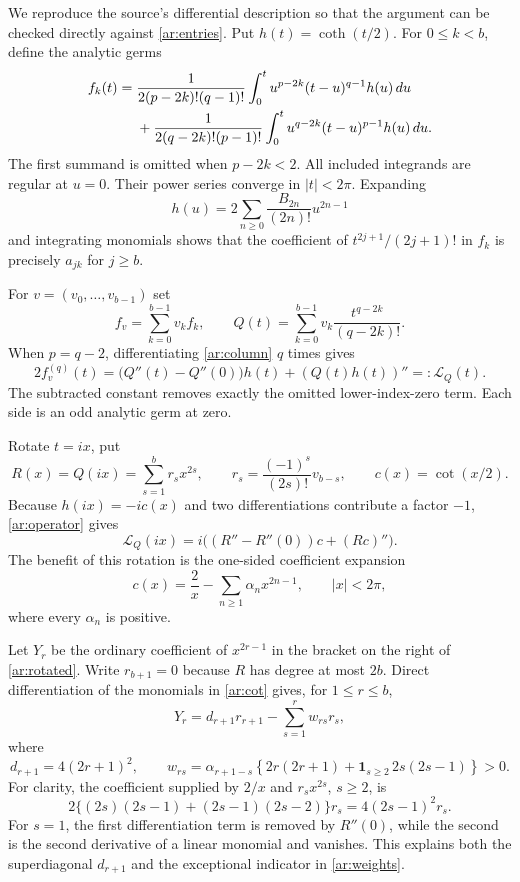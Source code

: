 \documentclass[11pt,a4paper]{article}
\numberwithin{equation}{section}
\theoremstyle{definition}
\theoremstyle{remark}
\begin{document}
We reproduce the source's differential description so that the argument
can be checked directly against \eqref{ar:entries}. Put $h(t)=\coth(t/2)$.
For $0\le k<b$, define the analytic germs
\begin{align}
 f_k(t)={}&\frac{1}{2(p-2k)!(q-1)!}
      \int_0^t u^{p-2k}(t-u)^{q-1}h(u)\,du\notag\\
 &+\frac{1}{2(q-2k)!(p-1)!}
      \int_0^t u^{q-2k}(t-u)^{p-1}h(u)\,du.
 \label{ar:column}
\end{align}
The first summand is omitted when $p-2k<2$. All included integrands
are regular at $u=0$. Their power series converge in $|t|<2\pi$.
Expanding
\[
        h(u)=2\sum_{n\ge0}\frac{B_{2n}}{(2n)!}u^{2n-1}
\]
and integrating monomials shows that the coefficient of
$t^{2j+1}/(2j+1)!$ in $f_k$ is precisely $a_{jk}$ for $j\ge b$.

For $v=(v_0,\ldots,v_{b-1})$ set
\[
 f_v=\sum_{k=0}^{b-1}v_kf_k,
 \qquad Q(t)=\sum_{k=0}^{b-1}v_k\frac{t^{q-2k}}{(q-2k)!}.
\]
When $p=q-2$, differentiating \eqref{ar:column} $q$ times gives
\begin{equation}\label{ar:operator}
 2f_v^{(q)}(t)
    =\bigl(Q''(t)-Q''(0)\bigr)h(t)+(Q(t)h(t))''
    =:\mathcal L_Q(t).
\end{equation}
The subtracted constant removes exactly the omitted lower-index-zero
term. Each side is an odd analytic germ at zero.

Rotate $t=ix$, put
\[
 R(x)=Q(ix)=\sum_{s=1}^b r_sx^{2s},\qquad
 r_s=\frac{(-1)^s}{(2s)!}v_{b-s},
 \qquad c(x)=\cot(x/2).
\]
Because $h(ix)=-ic(x)$ and two differentiations contribute a factor
$-1$, \eqref{ar:operator} gives
\begin{equation}\label{ar:rotated}
 \mathcal L_Q(ix)=i\bigl((R''-R''(0))c+(Rc)''\bigr).
\end{equation}
The benefit of this rotation is the one-sided coefficient expansion
\begin{equation}\label{ar:cot}
 c(x)=\frac2x-\sum_{n\ge1}\alpha_nx^{2n-1},\qquad |x|<2\pi,
\end{equation}
where every $\alpha_n$ is positive.

Let $Y_r$ be the ordinary coefficient of $x^{2r-1}$ in the bracket
on the right of \eqref{ar:rotated}. Write $r_{b+1}=0$ because $R$
has degree at most $2b$. Direct differentiation of the monomials in
\eqref{ar:cot} gives, for $1\le r\le b$,
\begin{equation}\label{ar:coefficient}
 Y_r=d_{r+1}r_{r+1}-\sum_{s=1}^r w_{rs}r_s,
\end{equation}
where
\begin{equation}\label{ar:weights}
 d_{r+1}=4(2r+1)^2,\qquad
 w_{rs}=\alpha_{r+1-s}
  \left\{2r(2r+1)+\mathbf1_{s\ge2}\,2s(2s-1)\right\}>0.
\end{equation}
For clarity, the coefficient supplied by $2/x$ and $r_sx^{2s}$,
$s\ge2$, is
\[
 2\{(2s)(2s-1)+(2s-1)(2s-2)\}r_s
       =4(2s-1)^2r_s.
\]
For $s=1$, the first differentiation term is removed by $R''(0)$,
while the second is the second derivative of a linear monomial and
vanishes. This explains both the superdiagonal $d_{r+1}$ and the
exceptional indicator in \eqref{ar:weights}.
\end{document}
